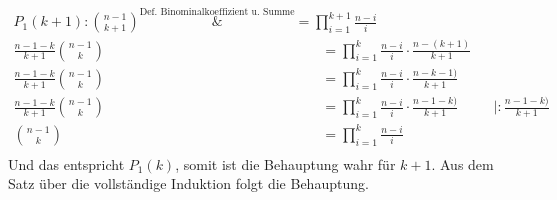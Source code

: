 \documentclass{article}
\begin{document}
\begin{enumerate}[a)]
  \begin{align*}
    P_1(k + 1) \colon \binom{n - 1}{k + 1} \overset{\text{Def. Binominalkoeffizient u. Summe}}&= \prod\limits_{i=1}^{k + 1} \frac{n - i}{i} \\
    \frac{n  - 1 - k}{k + 1} \binom{n - 1}{k} &= \prod\limits_{i=1}^{k} \frac{n - i}{i} \cdot \frac{n - (k + 1)}{k + 1}  \\
    \frac{n  - 1 - k}{k + 1} \binom{n - 1}{k} &= \prod\limits_{i=1}^{k} \frac{n - i}{i} \cdot \frac{n - k - 1)}{k + 1}  \\
    \frac{n  - 1 - k}{k + 1} \binom{n - 1}{k} &= \prod\limits_{i=1}^{k} \frac{n - i}{i} \cdot \frac{n - 1 - k)}{k + 1}  && | :\frac{n - 1 - k)}{k + 1} \\
    \binom{n - 1}{k} &= \prod\limits_{i=1}^{k} \frac{n - i}{i} \\
  \end{align*}
  Und das entspricht $P_1(k)$, somit ist die Behauptung wahr für $k + 1$. Aus dem Satz über die vollständige Induktion folgt die Behauptung. 


\end{enumerate}
\end{document}
